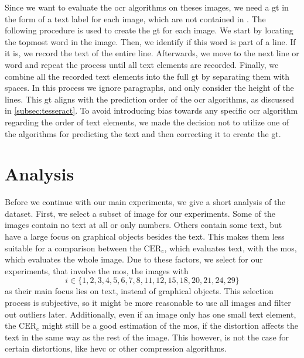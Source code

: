 Since we want to evaluate the \gls{ocr} algorithms on theses images, we need a \gls{gt} in the form of a text label for each image, which are not contained in \cite{ni_esim_2017}.
The following procedure is used to create the \gls{gt} for each image.
We start by locating the topmost word in the image.
Then, we identify if this word is part of a line.
If it is, we record the text of the entire line.
Afterwards, we move to the next line or word and repeat the process until all text elements are recorded.
Finally, we combine all the recorded text elements into the full \gls{gt} by separating them with spaces.
In this process we ignore paragraphs, and only consider the height of the lines.
This \gls{gt} aligns with the prediction order of the \gls{ocr} algorithms, as discussed in \autoref{subsec:tesseract}.
To avoid introducing bias towards any specific \gls{ocr} algorithm regarding the order of text elements, we made the decision not to utilize one of the algorithms for predicting the text and then correcting it to create the \gls{gt}.



\section{Analysis}
\label{sec:dataset_analysis}


Before we continue with our main experiments, we give a short analysis of the dataset.
First, we select a subset of image for our experiments.
Some of the images contain no text at all or only numbers.
Others contain some text, but have a large focus on graphical objects besides the text.
This makes them less suitable for a comparison between the $\text{CER}_{\text{c}}$, which evaluates text, with the \gls{mos}, which evaluates the whole image.
Due to these factors, we select for our experiments, that involve the \gls{mos}, the images with
\begin{equation}
    i \in \{1, 2, 3, 4, 5, 6, 7, 8, 11, 12, 15, 18, 20, 21, 24, 29\}
    \label{eq:mos_images}
\end{equation}
as their main focus lies on text, instead of graphical objects.
This selection process is subjective, so it might be more reasonable to use all images and filter out outliers later.
Additionally, even if an image only has one small text element, the $\text{CER}_{\text{c}}$ might still be a good estimation of the \gls{mos}, if the distortion affects the text in the same way as the rest of the image.
This however, is not the case for certain distortions, like \gls{hevc} or other compression algorithms.

